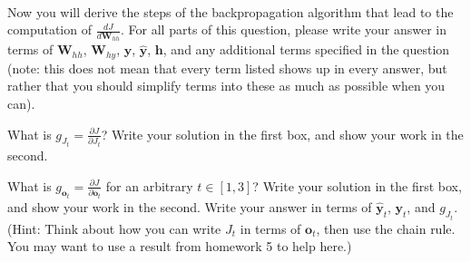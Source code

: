 \documentclass[11pt,addpoints,answers]{exam}
\newcommand{\hv}{\mathbf{h}}
\newcommand{\ov}{\mathbf{o}}
\newcommand{\yv}{\mathbf{y}}
\newcommand{\Wv}{\mathbf{W}}
\begin{document}
\begin{questions}
\begin{parts}
\begin{subparts}
    \begin{your_solution}[title=(a),height=2cm,width=6cm]
    \end{your_solution}
     \begin{your_solution}[title=(b),height=2cm,width=6cm]
    \end{your_solution}\\
     \begin{your_solution}[title=(c),height=2cm,width=6cm]
    \end{your_solution}
     \begin{your_solution}[title=(d),height=2cm,width=6cm]
    \end{your_solution}

\clearpage

\subpart Now you will derive the steps of the backpropagation algorithm that lead to the computation of $\frac{dJ}{d\Wv_{hh}}$. For all parts of this question, please write your answer in terms of $\Wv_{hh}$, $\Wv_{hy}$, $\yv$, $\hat{\yv}$, $\hv$, and any additional terms specified in the question (note: this does not mean that every term listed shows up in every answer, but rather that you should simplify terms into these as much as possible when you can).

    \begin{subsubparts}
        \subsubpart[2] What is $g_{J_t} = \frac{\partial J}{\partial J_t}$? Write your solution in the first box, and show your work in the second.
        
    \begin{your_solution}[title=$\frac{\partial J}{\partial J_t}$,height=2.5cm,width=8.5cm]
    \end{your_solution}
    
    \begin{your_solution}[title=Work,height=5.5cm,width=14cm]
    \end{your_solution}

    \clearpage

     \subsubpart[2] What is $g_{\ov_t} = \frac{\partial J}{\partial \ov_t}$ for an arbitrary $t \in [1,3]$? Write your solution in the first box, and show your work in the second. Write your answer in terms of $\hat{\yv}_t$, $\yv_t$, and $g_{J_t}$. (Hint: Think about how you can write $J_t$ in terms of $\ov_t$, then use the chain rule. You may want to use a result from homework 5 to help here.)
        

\end{subsubparts}
\end{subparts}
\end{parts}
\end{questions}
\end{document}
